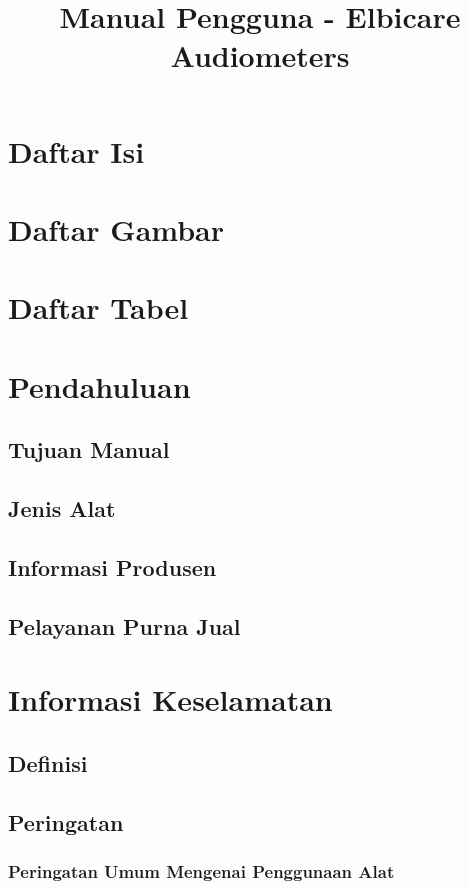 \documentclass[11pt,a4paper,twoside,draft,onecolumn]{book}
\title{Manual Pengguna - Elbicare Audiometers}
\begin{document}
	\maketitle
	\section{Daftar Isi}
	\newpage
	
	\section{Daftar Gambar}
	\newpage
	
	\section{Daftar Tabel}
	\newpage
	
	\section{Pendahuluan}
		\subsection{Tujuan Manual}
		\subsection{Jenis Alat}
		\subsection{Informasi Produsen}
		\subsection{Pelayanan Purna Jual}
	\newpage
	
	\section{Informasi Keselamatan}
		\subsection{Definisi}
		\subsection{Peringatan}
			\subsubsection{Peringatan Umum Mengenai Penggunaan Alat}
\end{document}
